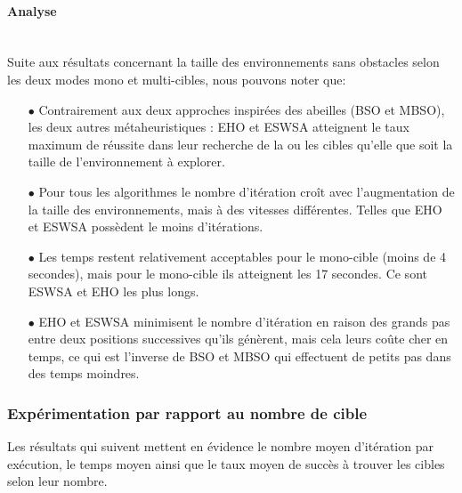 \paragraph{Analyse}
\textbf{ }\\
Suite aux résultats concernant la taille des environnements sans obstacles selon les deux modes mono et multi-cibles, nous pouvons noter que:
\begin{itemize}
	\item[$\bullet$] Contrairement aux deux approches inspirées des abeilles (BSO et MBSO), les deux autres métaheuristiques : EHO et ESWSA atteignent le taux maximum de réussite dans leur recherche de la ou les cibles qu'elle que soit la taille de l'environnement à explorer.
	\item[$\bullet$] Pour tous les algorithmes le nombre d'itération croît avec l'augmentation de la taille des environnements, mais à des vitesses différentes. Telles que EHO et ESWSA possèdent le moins d'itérations.
	\item[$\bullet$] Les temps restent relativement acceptables pour le mono-cible (moins de 4 secondes), mais pour le mono-cible ils atteignent les 17 secondes.
	Ce sont ESWSA et EHO les plus longs.
	\item[$\bullet$] EHO et ESWSA minimisent le nombre d'itération en raison des grands pas entre deux positions successives qu'ils génèrent, mais cela leurs coûte cher en temps, ce qui est l'inverse de BSO et MBSO qui effectuent de petits pas dans des temps moindres.
\end{itemize} 








\subsubsection{Expérimentation par rapport au nombre de cible}
Les résultats qui suivent mettent en évidence le nombre moyen d'itération par exécution, le temps moyen ainsi que le taux moyen de succès à trouver les cibles selon leur nombre.

